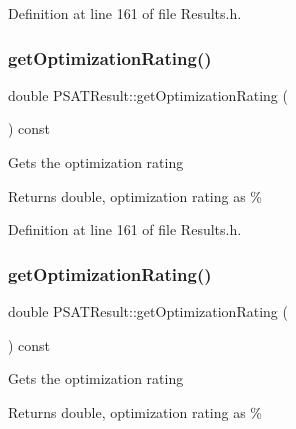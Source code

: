 Definition at line 161 of file Results.\+h.

\mbox{\label{class_p_s_a_t_result_aa0a7001461408fcb06a6c22ce2d064db}} 
\subsubsection{\texorpdfstring{get\+Optimization\+Rating()}{getOptimizationRating()}\hspace{0.1cm}{\footnotesize\ttfamily [2/3]}}
{\footnotesize\ttfamily double P\+S\+A\+T\+Result\+::get\+Optimization\+Rating (\begin{DoxyParamCaption}{ }\end{DoxyParamCaption}) const\hspace{0.3cm}{\ttfamily [inline]}}

Gets the optimization rating \begin{DoxyReturn}{Returns}
double, optimization rating as \% 
\end{DoxyReturn}


Definition at line 161 of file Results.\+h.

\mbox{\label{class_p_s_a_t_result_aa0a7001461408fcb06a6c22ce2d064db}} 
\subsubsection{\texorpdfstring{get\+Optimization\+Rating()}{getOptimizationRating()}\hspace{0.1cm}{\footnotesize\ttfamily [3/3]}}
{\footnotesize\ttfamily double P\+S\+A\+T\+Result\+::get\+Optimization\+Rating (\begin{DoxyParamCaption}{ }\end{DoxyParamCaption}) const\hspace{0.3cm}{\ttfamily [inline]}}

Gets the optimization rating \begin{DoxyReturn}{Returns}
double, optimization rating as \% 
\end{DoxyReturn}


